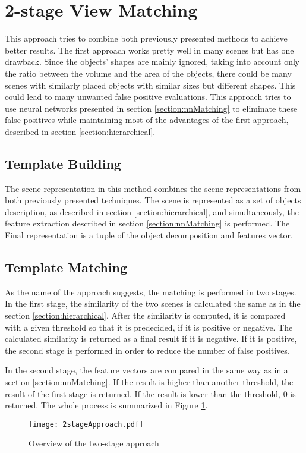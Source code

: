 \section{2-stage View Matching}\label{section:2stage}

This approach tries to combine both previously presented methods to achieve better results. The first approach works pretty well in many scenes but has one drawback. Since the objects' shapes are mainly ignored, taking into account only the ratio between the volume and the area of the objects, there could be many scenes with similarly placed objects with similar sizes but different shapes. This could lead to many unwanted false positive evaluations. This approach tries to use neural networks presented in section \ref{section:nnMatching} to eliminate these false positives while maintaining most of the advantages of the first approach, described in section \ref{section:hierarchical}.\par

\subsection{Template Building}

The scene representation in this method combines the scene representations from both previously presented techniques. The scene is represented as a set of objects description, as described in section \ref{section:hierarchical}, and simultaneously, the feature extraction described in section \ref{section:nnMatching} is performed. The Final representation is a tuple of the object decomposition and features vector.

\subsection{Template Matching}

As the name of the approach suggests, the matching is performed in two stages. In the first stage, the similarity of the two scenes is calculated the same as in the section \ref{section:hierarchical}. After the similarity is computed, it is compared with a given threshold so that it is predecided, if it is positive or negative. The calculated similarity is returned as a final result if it is negative. If it is positive, the second stage is performed in order to reduce the number of false positives.\par
In the second stage, the feature vectors are compared in the same way as in a section \ref{section:nnMatching}. If the result is higher than another threshold, the result of the first stage is returned. If the result is lower than the threshold, 0 is returned. The whole process is summarized in Figure \ref{fig:twoStageDiagram}.

\begin{figure}[htpb]
    \centering
    \texttt{[image: 2stageApproach.pdf]}
    \caption{Overview of the two-stage approach} \label{fig:twoStageDiagram}
\end{figure}